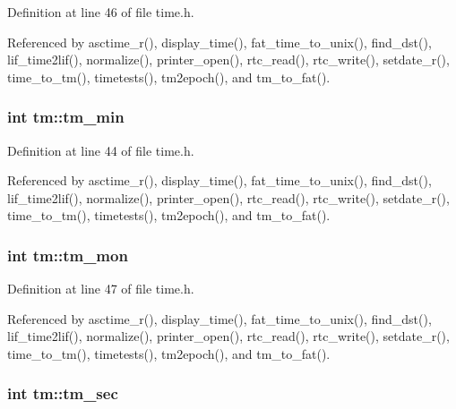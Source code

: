 Definition at line 46 of file time.\+h.



Referenced by asctime\+\_\+r(), display\+\_\+time(), fat\+\_\+time\+\_\+to\+\_\+unix(), find\+\_\+dst(), lif\+\_\+time2lif(), normalize(), printer\+\_\+open(), rtc\+\_\+read(), rtc\+\_\+write(), setdate\+\_\+r(), time\+\_\+to\+\_\+tm(), timetests(), tm2epoch(), and tm\+\_\+to\+\_\+fat().

\subsubsection[{\texorpdfstring{tm\+\_\+min}{tm_min}}]{\setlength{\rightskip}{0pt plus 5cm}int tm\+::tm\+\_\+min}\hypertarget{structtm_af414eb7c86cc3099595211eee4d4211b}{}\label{structtm_af414eb7c86cc3099595211eee4d4211b}


Definition at line 44 of file time.\+h.



Referenced by asctime\+\_\+r(), display\+\_\+time(), fat\+\_\+time\+\_\+to\+\_\+unix(), find\+\_\+dst(), lif\+\_\+time2lif(), normalize(), printer\+\_\+open(), rtc\+\_\+read(), rtc\+\_\+write(), setdate\+\_\+r(), time\+\_\+to\+\_\+tm(), timetests(), tm2epoch(), and tm\+\_\+to\+\_\+fat().

\subsubsection[{\texorpdfstring{tm\+\_\+mon}{tm_mon}}]{\setlength{\rightskip}{0pt plus 5cm}int tm\+::tm\+\_\+mon}\hypertarget{structtm_a112ac36fa2f593777138a417cf031e17}{}\label{structtm_a112ac36fa2f593777138a417cf031e17}


Definition at line 47 of file time.\+h.



Referenced by asctime\+\_\+r(), display\+\_\+time(), fat\+\_\+time\+\_\+to\+\_\+unix(), find\+\_\+dst(), lif\+\_\+time2lif(), normalize(), printer\+\_\+open(), rtc\+\_\+read(), rtc\+\_\+write(), setdate\+\_\+r(), time\+\_\+to\+\_\+tm(), timetests(), tm2epoch(), and tm\+\_\+to\+\_\+fat().

\subsubsection[{\texorpdfstring{tm\+\_\+sec}{tm_sec}}]{\setlength{\rightskip}{0pt plus 5cm}int tm\+::tm\+\_\+sec}\hypertarget{structtm_a4d098a9a5c03a00b2ee61e10851de81e}{}\label{structtm_a4d098a9a5c03a00b2ee61e10851de81e}



